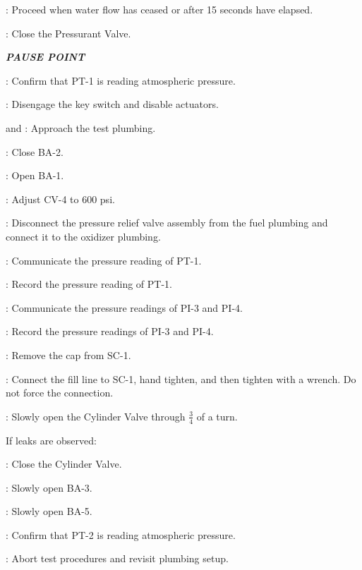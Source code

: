 \begin{checklist}
    \item \ops{}: Proceed when water flow has ceased or after 15 seconds have elapsed.
    \item \control{}: Close the Pressurant Valve.
    \item \textbf{\textit{PAUSE POINT}}
    \item \daq{}: Confirm that PT-1 is reading atmospheric pressure.
	\item \control{}: Disengage the key switch and disable actuators.    
    \item \primary{} and \secondary{}: Approach the test plumbing.
    \item \primary{}: Close BA-2.
    \item \primary{}: Open BA-1.
    \item \primary{}: Adjust CV-4 to 600 psi.
    \item \primary{}: Disconnect the pressure relief valve assembly from the fuel plumbing and connect it to the oxidizer plumbing.
    \item \daq{}: Communicate the pressure reading of PT-1.
    \item \ops{}: Record the pressure reading of PT-1.
    \item \primary{}: Communicate the pressure readings of PI-3 and PI-4.
    \item \ops{}: Record the pressure readings of PI-3 and PI-4.
    \item \primary{}: Remove the cap from SC-1.
    \item \primary{}: Connect the fill line to SC-1, hand tighten, and then tighten with a wrench. Do not force the connection.
    \item \primary{}: Slowly open the Cylinder Valve through $\frac{3}{4}$  of a turn.
    \begin{checklist}[label=$\bullet$]
        \item If leaks are observed:
        \begin{checklist}
            \item \primary{}: Close the Cylinder Valve.
            \item \primary{}: Slowly open BA-3.
            \item \primary{}: Slowly open BA-5.
            \item \daq{}: Confirm that PT-2 is reading atmospheric pressure.
            \item \ops{}: Abort test procedures and revisit plumbing setup.
        \end{checklist}

\end{checklist}
\end{checklist}
